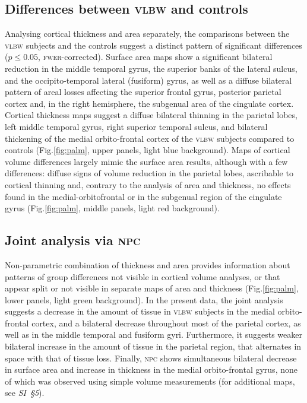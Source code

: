 \subsection{Differences between \textsc{vlbw} and controls}

Analysing cortical thickness and area separately, the comparisons between the \textsc{vlbw} subjects and the controls suggest a distinct pattern of significant differences ($p \leqslant 0.05$, \textsc{fwer}-corrected). Surface area maps show a significant bilateral reduction in the middle temporal gyrus, the superior banks of the lateral sulcus, and the occipito-temporal lateral (fusiform) gyrus, as well as a diffuse bilateral pattern of areal losses affecting the superior frontal gyrus, posterior parietal cortex and, in the right hemisphere, the subgenual area of the cingulate cortex. Cortical thickness maps suggest a diffuse bilateral thinning in the parietal lobes, left middle temporal gyrus, right superior temporal sulcus, and bilateral thickening of the medial orbito-frontal cortex of the \textsc{vlbw} subjects compared to controls (Fig.\ref{fig:palm}, upper panels, light blue background). Maps of cortical volume differences largely mimic the surface area results, although with a few differences: diffuse signs of volume reduction in the parietal lobes, ascribable to cortical thinning and, contrary to the analysis of area and thickness, no effects found in the medial-orbitofrontal or in the subgenual region of the cingulate gyrus (Fig.\ref{fig:palm}, middle panels, light red background).

\subsection{Joint analysis via \textsc{npc}}

Non-parametric combination of thickness and area provides information about patterns of group differences not visible in cortical volume analyses, or that appear split or not visible in separate maps of area and thickness (Fig.\ref{fig:palm}, lower panels, light green background). In the present data, the joint analysis suggests a decrease in the amount of tissue in \textsc{vlbw} subjects in the medial orbito-frontal cortex, and a bilateral decrease throughout most of the parietal cortex, as well as in the middle temporal and fusiform gyri. Furthermore, it suggests weaker bilateral increase in the amount of tissue in the parietal region, that alternates in space with that of tissue loss. Finally, \textsc{npc} shows simultaneous bilateral decrease in surface area and increase in thickness in the medial orbito-frontal gyrus, none of which was observed using simple volume measurements (for additional maps, see \emph{SI~§5}).

